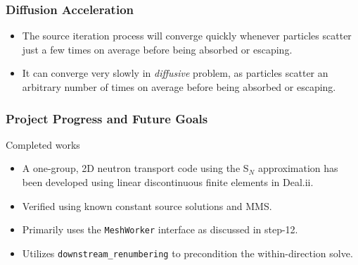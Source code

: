 \documentclass[xcolor={usenames,dvipsnames,svgnames,table}]{beamer}
\begin{document}

\begin{frame}\frametitle{Diffusion Acceleration}
	\begin{itemize}
		\item The source iteration process will converge quickly whenever particles scatter just a few times on average before being absorbed or escaping.
		\item It can converge very slowly in \textit{diffusive} problem, as particles scatter an arbitrary number of times on average before being absorbed or escaping.
	\end{itemize}
\end{frame}


\begin{frame}\frametitle{Project Progress and Future Goals}
	\begin{block}{Completed works}
		\begin{itemize}
			\item A one-group, 2D neutron transport code using the S$_N$ approximation has been developed using linear discontinuous finite elements in Deal.ii.
			\item Verified using known constant source solutions and MMS.
			\item Primarily uses the \texttt{MeshWorker} interface as discussed in step-12.
			\item Utilizes \texttt{downstream\_renumbering} to precondition the within-direction solve.
		\end{itemize}
	\end{block}
\end{frame}
\end{document}
